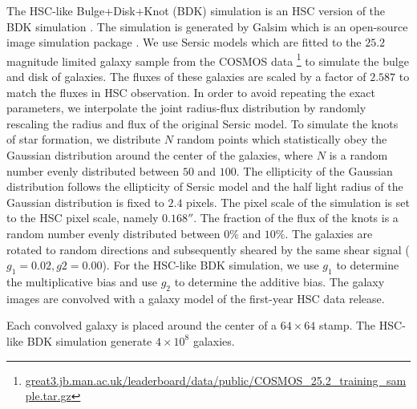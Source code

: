 The HSC-like Bulge+Disk+Knot (BDK) simulation is an HSC version of the BDK
simulation \citep{metacal2}. The simulation is generated by Galsim which is an
open-source image simulation package \citep{GalSim}. We use Sersic models
\citep{Sersic1963} which are fitted to the $25.2$ magnitude limited galaxy
sample from the COSMOS data
\footnote{\url{great3.jb.man.ac.uk/leaderboard/data/public/COSMOS_25.2_training_sample.tar.gz}}
to simulate the bulge and disk of galaxies. The fluxes of these galaxies are
scaled by a factor of $2.587$ to match the fluxes in HSC observation. In order
to avoid repeating the exact parameters, we interpolate the joint radius-flux
distribution by randomly rescaling the radius and flux of the original Sersic
model. To simulate the knots of star formation, we distribute $N$ random points
which statistically obey the Gaussian distribution around the center of the
galaxies, where $N$ is a random number evenly distributed between $50$ and
$100$. The ellipticity of the Gaussian distribution follows the ellipticity of
Sersic model and the half light radius of the Gaussian distribution is fixed to
$2.4$ pixels. The pixel scale of the simulation is set to the HSC pixel scale,
namely $0.168''$. The fraction of the flux of the knots is a random number
evenly distributed between $0\%$ and $10\%$. The galaxies are rotated to random
directions and subsequently sheared by the same shear signal
($g_1=0.02,g2=0.00$). For the HSC-like BDK simulation, we use $g_1$ to
determine the multiplicative bias and use $g_2$ to determine the additive bias.
The galaxy images are convolved with a galaxy model of the first-year HSC
data release.


Each convolved galaxy is placed around the center of a $64\times 64$ stamp. The
HSC-like BDK simulation generate $4\times 10^8$ galaxies.
